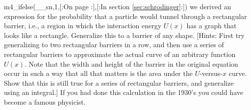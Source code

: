 m4_ifelse(__sn,1,[:On page \pageref{quantitativetunneling}:],[:In section \ref{sec:schrodinger}:])
we derived an expression for the
probability that a particle would tunnel through a
rectangular barrier, i.e., a region in which the interaction
energy $U(x)$ has a graph that looks like a rectangle. Generalize this to a barrier
of any shape. [Hints: First try generalizing to two
rectangular barriers in a row, and then use a series of
rectangular barriers to approximate the actual curve of an
arbitrary function $U(x)$. Note that the width and height of the
barrier in the original equation occur in such a way that
all that matters is the area under the $U$-versus-$x$
curve. Show that this is still true for a series of
rectangular barriers, and generalize using an integral.]  If
you had done this calculation in the 1930's you could have
become a famous physicist.

